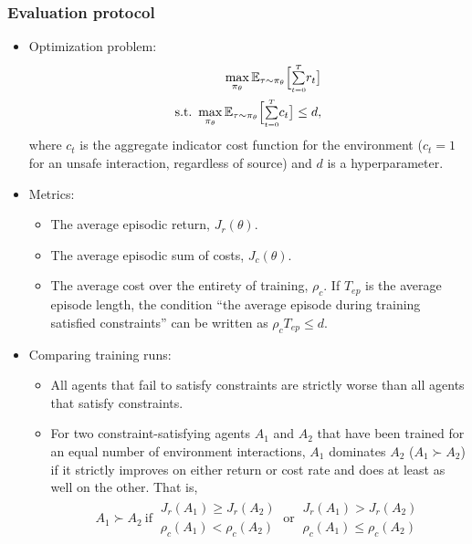 \subsubsection{Evaluation protocol}
\begin{itemize}
\item
	Optimization problem:
	\begin{align}
		\max_{\pi_{\theta}} \mathbb{E}_{\tau \sim \pi_{\theta}} \Big[ {\textstyle \sum\limits_{\scriptscriptstyle t=0}^{\scriptscriptstyle T}} {r_t} \big] \nonumber \\	
		\mathrm{s.t.~} \max_{\pi_{\theta}} \mathbb{E}_{\tau \sim \pi_{\theta}}\Big[{\textstyle \sum\limits_{\scriptscriptstyle t=0}^{\scriptscriptstyle T}}{c_t}\big] \leq d,
	\end{align}
where $c_t$ is the aggregate indicator cost function for the environment ($c_t = 1$ for an unsafe interaction, regardless of source) and $d$ is a hyperparameter. 
\item
	Metrics:
	\begin{itemize}
	\item
		The average episodic return, $J_r(\theta)$.
	\item
		The average episodic sum of costs, $J_c(\theta)$.
	\item
		The average cost over the entirety of training, $\rho_c$. If $T_{ep}$ is the average episode length, the condition ``the average episode during training satisfied constraints'' can be written as $\rho_c T_{ep} \leq d$.
	\end{itemize}
\item
	Comparing training runs:
	\begin{itemize}
	\item
		All agents that fail to satisfy constraints are strictly worse than all agents that satisfy constraints.
	\item
		For two constraint-satisfying agents $A_1$ and $A_2$ that have been trained for an equal number of environment interactions, $A_1$ dominates $A_2$ ($A_1 \succ A_2$) if it strictly improves on either return or cost rate and does at least as well on the other. That is,
		\begin{align}
			A_1 \succ A_2 ~ \mathrm{if} ~ 
			\begin{array}{cc}
			J_r(A_1) \geq J_r(A_2) \\ \rho_c(A_1) < \rho_c(A_2)
			\end{array}  ~ \mathrm{or} ~ 
			\begin{array}{cc}
			J_r(A_1) > J_r(A_2) \\ \rho_c(A_1) \leq \rho_c(A_2)	
			\end{array} 
		\end{align}

\end{itemize}
\end{itemize}
